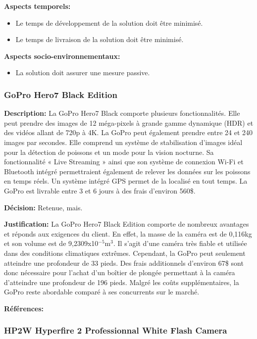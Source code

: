\textbf{Aspects temporels:}
\begin{itemize}[label = {--}]
    \item Le temps de développement de la solution doit être minimisé.
    \item Le temps de livraison de la solution doit être minimisé.
\end{itemize}

\textbf{Aspects socio-environnementaux:}
\begin{itemize}[label = {--}]
    \item La solution doit assurer une mesure passive.
\end{itemize}

\subsubsection{GoPro Hero7 Black Edition}

\textbf{Description:} La GoPro Hero7 Black comporte plusieurs fonctionnalités. Elle peut prendre des images de 12 méga-pixels à grande gamme dynamique (HDR) et des vidéos allant de 720p à 4K. La GoPro peut également prendre entre 24 et 240 images par secondes. Elle comprend un système de stabilisation d'images idéal pour la détection de poissons et un mode pour la vision nocturne. Sa fonctionnalité « Live Streaming » ainsi que son système de connexion Wi-Fi et Bluetooth intégré permettraient également de relever les données sur les poissons en temps réels. Un système intégré GPS permet de la localisé en tout temps. La GoPro est livrable entre 3 et 6 jours à des frais d'environ 560\$.

\textbf{Décision:} Retenue, mais.

\textbf{Justification:} La GoPro Hero7 Black Edition comporte de nombreux avantages et réponds aux exigences du client. En effet, la masse de la caméra est de 0,116kg et son volume est de 9,2309x10$^{-5}$m$^3$. Il s'agit d'une caméra très fiable et utilisée dans des conditions climatiques extrêmes. Cependant, la GoPro peut seulement atteindre une profondeur de 33 pieds. Des frais additionnels d'environ 67\$ sont donc nécessaire pour l'achat d'un boîtier de plongée permettant à la caméra d'atteindre une profondeur de 196 pieds. Malgré les coûts supplémentaires, la GoPro reste abordable comparé à ses concurrents sur le marché.

\textbf{Références:} \cite{GoPro_Specs} \cite{GoPro_Waterproof}


\subsubsection{HP2W Hyperfire 2 Professionnal White Flash Camera}
\label{subsubsectionHyperfire}

